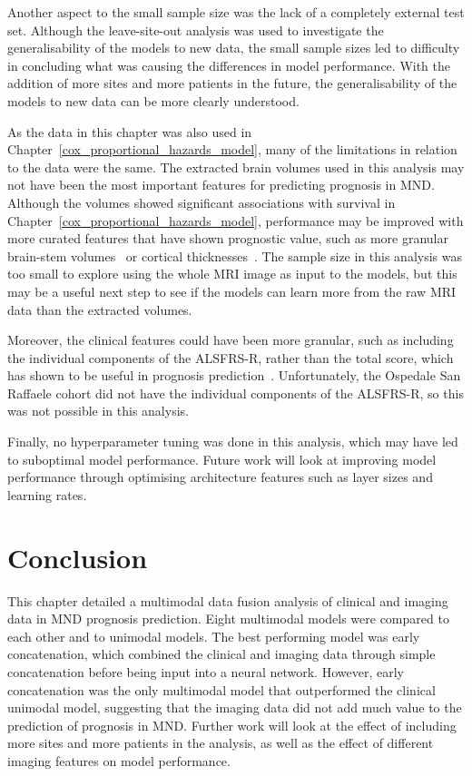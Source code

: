 Another aspect to the small sample size was the lack of a completely external test set.
Although the leave-site-out analysis was used to investigate the generalisability of the models to new data, the small sample sizes led to difficulty in concluding what was causing the differences in model performance.
With the addition of more sites and more patients in the future, the generalisability of the models to new data can be more clearly understood.

As the data in this chapter was also used in Chapter~\ref{cox_proportional_hazards_model}, many of the limitations in relation to the data were the same.
The extracted brain volumes used in this analysis may not have been the most important features for predicting prognosis in MND.
Although the volumes showed significant associations with survival in Chapter~\ref{cox_proportional_hazards_model}, performance may be improved with more curated features that have shown prognostic value, such as more granular brain-stem volumes~\cite{milellaMedullaOblongataVolume2022} or cortical thicknesses~\cite{burghMultimodalLongitudinalStudy2020,dieckmannCorticalSubcorticalGrey2022}.
The sample size in this analysis was too small to explore using the whole MRI image as input to the models, but this may be a useful next step to see if the models can learn more from the raw MRI data than the extracted volumes.

Moreover, the clinical features could have been more granular, such as including the individual components of the ALSFRS-R, rather than the total score, which has shown to be useful in prognosis prediction~\cite{hothornRandomForest4LifeRandomForest2014}.
Unfortunately, the Ospedale San Raffaele cohort did not have the individual components of the ALSFRS-R, so this was not possible in this analysis.

Finally, no hyperparameter tuning was done in this analysis, which may have led to suboptimal model performance.
Future work will look at improving model performance through optimising architecture features such as layer sizes and learning rates.

\section{Conclusion}

This chapter detailed a multimodal data fusion analysis of clinical and imaging data in MND prognosis prediction.
Eight multimodal models were compared to each other and to unimodal models.
The best performing model was early concatenation, which combined the clinical and imaging data through simple concatenation before being input into a neural network.
However, early concatenation was the only multimodal model that outperformed the clinical unimodal model, suggesting that the imaging data did not add much value to the prediction of prognosis in MND.
Further work will look at the effect of including more sites and more patients in the analysis, as well as the effect of different imaging features on model performance.
